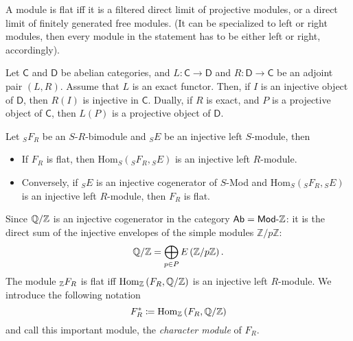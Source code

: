 \begin{thm}[Lazard]
	A module is flat iff
	it is a filtered direct limit of projective modules,
	or a direct limit of finitely generated free modules.
	(It can be specialized to left or right modules, then every module in the
	statement has to be either left or right, accordingly).
\end{thm}

\begin{lem}
	Let $\mathsf{C}$ and $\mathsf{D}$ be abelian categories, and $L\colon \mathsf{C} \to \mathsf{D}$ and
	$R\colon \mathsf{D} \to \mathsf{C}$ be an adjoint pair $\left(L, R\right)$.
	Assume that $L$ is an exact functor.
	Then, if $I$ is an injective object of $\mathsf{D}$,
	then $R(I)$ is injective in $\mathsf{C}$.
	Dually, if $R$ is exact, and $P$ is a projective object of $\mathsf{C}$, then
	$L(P)$ is a projective object of $\mathsf{D}$.
\end{lem} 

\begin{prop}
	Let ${}_SF_R$ be an $S$-$R$-bimodule and ${}_SE$ be an injective left $S$-module, then
	\begin{itemize}
		\item If $F_R$ is flat, then $\mathrm{Hom}_{S}\left( {}_SF_R, {}_SE \right)$ is 
			an injective left $R$-module.
		\item Conversely, if ${}_SE$ is an injective cogenerator of $S$-Mod
			and $\mathrm{Hom}_{S}\left( {}_SF_R, {}_SE \right)$
			is an injective left $R$-module, then $F_R$ is flat.
	\end{itemize}
\end{prop} 

\begin{cor}
	Since $\mathbb{Q}/\mathbb{Z}$ is an injective cogenerator in the category $\mathsf{Ab} = \mathsf{Mod}\text{-}\mathbb{Z}$:
	it is the direct sum of the injective envelopes of the simple modules $\mathbb{Z}/p\mathbb{Z}$:
	\begin{equation}
		\mathbb{Q}/\mathbb{Z} = \bigoplus_{p \in P} E \left( \mathbb{Z}/p\mathbb{Z} \right)
	.\end{equation} 
	The module ${}_{\mathbb{Z}}F_R$ is flat iff
	$\mathrm{Hom}_{\mathbb{Z}}\left( F_R, \mathbb{Q}/\mathbb{Z} \right)$ is an injective left
	$R$-module.
	We introduce the following notation
	\begin{equation}
	F_R^*\coloneqq \mathrm{Hom}_{\mathbb{Z}}\left( F_R, \mathbb{Q}/\mathbb{Z} \right)
	\end{equation} 
	and call this important module, the {\em character module} of $F_R$.
\end{cor} 

